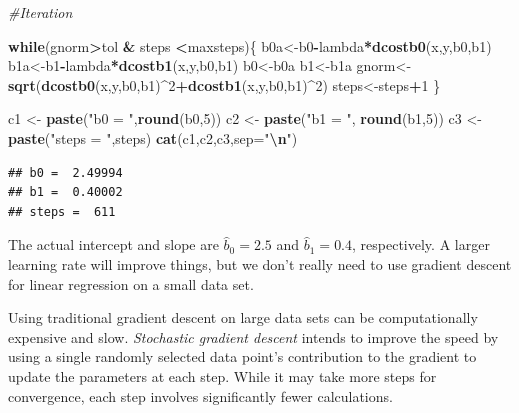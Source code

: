 \documentclass[
]{book}
\newenvironment{Shaded}{\begin{snugshade}}{\end{snugshade}}
\newcommand{\AttributeTok}[1]{\textcolor[rgb]{0.13,0.29,0.53}{#1}}
\newcommand{\CommentTok}[1]{\textcolor[rgb]{0.56,0.35,0.01}{\textit{#1}}}
\newcommand{\ControlFlowTok}[1]{\textcolor[rgb]{0.13,0.29,0.53}{\textbf{#1}}}
\newcommand{\DecValTok}[1]{\textcolor[rgb]{0.00,0.00,0.81}{#1}}
\newcommand{\FunctionTok}[1]{\textcolor[rgb]{0.13,0.29,0.53}{\textbf{#1}}}
\newcommand{\NormalTok}[1]{#1}
\newcommand{\OtherTok}[1]{\textcolor[rgb]{0.56,0.35,0.01}{#1}}
\newcommand{\SpecialCharTok}[1]{\textcolor[rgb]{0.81,0.36,0.00}{\textbf{#1}}}
\newcommand{\StringTok}[1]{\textcolor[rgb]{0.31,0.60,0.02}{#1}}
\theoremstyle{definition}
\theoremstyle{definition}
\theoremstyle{definition}
\theoremstyle{definition}
\theoremstyle{remark}
\begin{document}
\begin{Shaded}
\begin{Highlighting}[]
\CommentTok{\#Iteration}

\ControlFlowTok{while}\NormalTok{(gnorm}\SpecialCharTok{\textgreater{}}\NormalTok{tol }\SpecialCharTok{\&}\NormalTok{ steps }\SpecialCharTok{\textless{}}\NormalTok{maxsteps)\{}
\NormalTok{  b0a}\OtherTok{\textless{}{-}}\NormalTok{b0}\SpecialCharTok{{-}}\NormalTok{lambda}\SpecialCharTok{*}\FunctionTok{dcostb0}\NormalTok{(x,y,b0,b1)}
\NormalTok{  b1a}\OtherTok{\textless{}{-}}\NormalTok{b1}\SpecialCharTok{{-}}\NormalTok{lambda}\SpecialCharTok{*}\FunctionTok{dcostb1}\NormalTok{(x,y,b0,b1)}
\NormalTok{  b0}\OtherTok{\textless{}{-}}\NormalTok{b0a}
\NormalTok{  b1}\OtherTok{\textless{}{-}}\NormalTok{b1a}
\NormalTok{  gnorm}\OtherTok{\textless{}{-}}\FunctionTok{sqrt}\NormalTok{(}\FunctionTok{dcostb0}\NormalTok{(x,y,b0,b1)}\SpecialCharTok{\^{}}\DecValTok{2}\SpecialCharTok{+}\FunctionTok{dcostb1}\NormalTok{(x,y,b0,b1)}\SpecialCharTok{\^{}}\DecValTok{2}\NormalTok{)}
\NormalTok{  steps}\OtherTok{\textless{}{-}}\NormalTok{steps}\SpecialCharTok{+}\DecValTok{1}
\NormalTok{\}}

\NormalTok{c1 }\OtherTok{\textless{}{-}} \FunctionTok{paste}\NormalTok{(}\StringTok{"b0 = "}\NormalTok{,}\FunctionTok{round}\NormalTok{(b0,}\DecValTok{5}\NormalTok{))}
\NormalTok{c2 }\OtherTok{\textless{}{-}} \FunctionTok{paste}\NormalTok{(}\StringTok{"b1 = "}\NormalTok{, }\FunctionTok{round}\NormalTok{(b1,}\DecValTok{5}\NormalTok{))}
\NormalTok{c3 }\OtherTok{\textless{}{-}} \FunctionTok{paste}\NormalTok{(}\StringTok{"steps = "}\NormalTok{,steps)}
\FunctionTok{cat}\NormalTok{(c1,c2,c3,}\AttributeTok{sep=}\StringTok{"}\SpecialCharTok{\textbackslash{}n}\StringTok{"}\NormalTok{)}
\end{Highlighting}
\end{Shaded}

\begin{verbatim}
## b0 =  2.49994
## b1 =  0.40002
## steps =  611
\end{verbatim}

The actual intercept and slope are \(\hat{b}_0=2.5\) and \(\hat{b}_1=0.4\), respectively. A larger learning rate will improve things, but we don't really need to use gradient descent for linear regression on a small data set.

Using traditional gradient descent on large data sets can be computationally expensive and slow. \emph{Stochastic gradient descent} intends to improve the speed by using a single randomly selected data point's contribution to the gradient to update the parameters at each step. While it may take more steps for convergence, each step involves significantly fewer calculations.
\end{document}
